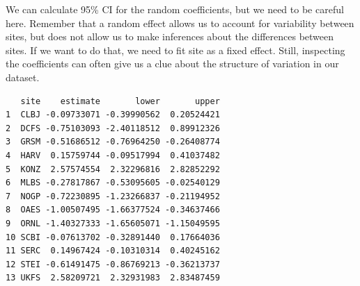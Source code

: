 \documentclass[
  13,
  letterpaper,
]{report}
\newenvironment{Shaded}{\begin{snugshade}}{\end{snugshade}}
\newcommand{\AttributeTok}[1]{\textcolor[rgb]{0.40,0.45,0.13}{#1}}
\newcommand{\CommentTok}[1]{\textcolor[rgb]{0.37,0.37,0.37}{#1}}
\newcommand{\ConstantTok}[1]{\textcolor[rgb]{0.56,0.35,0.01}{#1}}
\newcommand{\DecValTok}[1]{\textcolor[rgb]{0.68,0.00,0.00}{#1}}
\newcommand{\DocumentationTok}[1]{\textcolor[rgb]{0.37,0.37,0.37}{\textit{#1}}}
\newcommand{\FloatTok}[1]{\textcolor[rgb]{0.68,0.00,0.00}{#1}}
\newcommand{\FunctionTok}[1]{\textcolor[rgb]{0.28,0.35,0.67}{#1}}
\newcommand{\NormalTok}[1]{\textcolor[rgb]{0.00,0.23,0.31}{#1}}
\newcommand{\OtherTok}[1]{\textcolor[rgb]{0.00,0.23,0.31}{#1}}
\newcommand{\SpecialCharTok}[1]{\textcolor[rgb]{0.37,0.37,0.37}{#1}}
\newcommand{\StringTok}[1]{\textcolor[rgb]{0.13,0.47,0.30}{#1}}
\begin{document}
We can calculate 95\% CI for the random coefficients, but we need to be
careful here. Remember that a random effect allows us to account for
variability between sites, but does not allow us to make inferences
about the differences between sites. If we want to do that, we need to
fit site as a fixed effect. Still, inspecting the coefficients can often
give us a clue about the structure of variation in our dataset.

\begin{Shaded}
\end{Shaded}

\begin{verbatim}
   site    estimate       lower       upper
1  CLBJ -0.09733071 -0.39990562  0.20524421
2  DCFS -0.75103093 -2.40118512  0.89912326
3  GRSM -0.51686512 -0.76964250 -0.26408774
4  HARV  0.15759744 -0.09517994  0.41037482
5  KONZ  2.57574554  2.32296816  2.82852292
6  MLBS -0.27817867 -0.53095605 -0.02540129
7  NOGP -0.72230895 -1.23266837 -0.21194952
8  OAES -1.00507495 -1.66377524 -0.34637466
9  ORNL -1.40327333 -1.65605071 -1.15049595
10 SCBI -0.07613702 -0.32891440  0.17664036
11 SERC  0.14967424 -0.10310314  0.40245162
12 STEI -0.61491475 -0.86769213 -0.36213737
13 UKFS  2.58209721  2.32931983  2.83487459
\end{verbatim}
\end{document}
